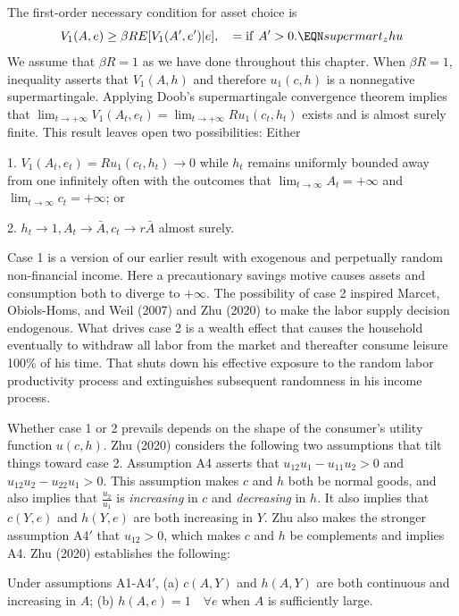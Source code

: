 \medskip
{}
The first-order necessary condition for asset choice is
$$ V_1(A,e) \geq \beta R E [ V_1(A',e') |e ], \quad = {\rm if} \ A' > 0 . \EQN supermart_zhu$$
We assume that $\beta R =1 $ as we have done throughout this chapter. When $\beta R =1$,
inequality  asserts that $V_1(A,h)$ and therefore $u_1(c,h)$ is a
nonnegative supermartingale.  Applying Doob's supermartingale convergence theorem  implies that
$\lim_{t\rightarrow +\infty} V_1(A_t, e_t) =\lim_{t \rightarrow +\infty} R u_1(c_t, h_t)  $ exists and is almost surely finite.
This result leaves open two possibilities: Either

\medskip
\item{1.} $V_1(A_t, e_t) = R u_1(c_t, h_t) \rightarrow 0$ while $h_t$ remains uniformly bounded away from  one infinitely often with the
outcomes that
$\lim_{t\rightarrow \infty } A_t = +\infty $ and $\lim_{t\rightarrow \infty} c_t = + \infty$; or
\medskip
\item{2.}  $h_t \rightarrow 1 , A_t \rightarrow \bar A, c_t \rightarrow r \bar A$ almost surely.
\medskip

Case 1 is a version of our earlier result with exogenous and perpetually random non-financial income.  Here  a precautionary savings motive
causes assets and consumption both to diverge to $+\infty$.  The possibility of case 2 inspired
Marcet, Obiols-Homs, and Weil (2007) and Zhu (2020) to make  the labor supply decision  endogenous. What drives case 2 is a wealth effect that causes the household eventually
to withdraw all labor from the market and thereafter consume leisure 100\% of his time. That shuts down his effective exposure to the random labor productivity process and  extinguishes subsequent randomness in his income process.

Whether case 1 or 2 prevails depends on the shape of the consumer's utility function $u(c,h)$.  Zhu (2020)
considers the following two assumptions that tilt things toward case 2. Assumption A4 asserts
that $u_{12} u_1 - u_{11}u_2 >0 $ and $u_{12} u_2 - u_{22} u_1 >0$.  This assumption makes
$c$ and $h$ both be normal goods, and also implies that ${\frac{u_2}{u_1}}$ is {\it increasing} in $c$ and {\it decreasing} in $h$. It also
implies that $c(Y,e)$ and $h(Y,e)$ are both increasing in $Y$.  Zhu also makes the stronger assumption
A4$'$ that $u_{12} >0$, which makes $c$ and $h$ be complements and implies A4.
Zhu (2020) establishes  the following:

\medskip
{}   Under assumptions A1-A4$'$, (a) $c(A,Y)$ and $h(A,Y)$ are both continuous and increasing in $A$;
(b) $h(A,e)=1 \quad \forall e$ when $A$ is sufficiently large.
\medskip

